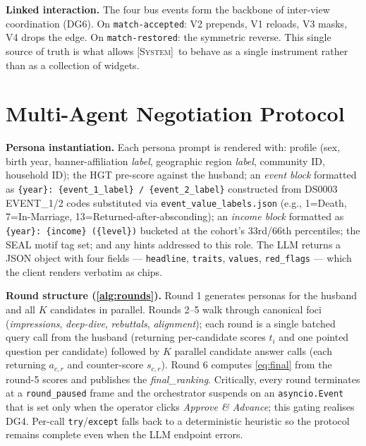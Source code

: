 \documentclass[review]{vgtc}                  %
\newcommand{\system}{\textsc{[System]}\xspace}
\begin{document}
\textbf{Linked interaction.} The four bus events form the backbone of
inter-view coordination (DG6). On \texttt{match-accepted}: V2
prepends, V1 reloads, V3 masks, V4 drops the edge. On
\texttt{match-restored}: the symmetric reverse. This single source of
truth is what allows \system\ to behave as a single instrument
rather than as a collection of widgets.

\section{Multi-Agent Negotiation Protocol}
\label{sec:mas}

\textbf{Persona instantiation.} Each persona prompt is rendered with:
profile (sex, birth year, banner-affiliation \emph{label}, geographic
region \emph{label}, community ID, household ID); the HGT pre-score
against the husband; an \emph{event block} formatted as
\texttt{\{year\}: \{event\_1\_label\} / \{event\_2\_label\}}
constructed from DS0003 EVENT\_1/2 codes substituted via
\texttt{event\_value\_labels.json} (e.g., 1=Death, 7=In-Marriage,
13=Returned-after-absconding); an \emph{income block} formatted as
\texttt{\{year\}: \{income\} (\{level\})} bucketed at the cohort's
33rd/66th percentiles; the SEAL motif tag set; and any hints
addressed to this role. The LLM returns a JSON object with four
fields --- \texttt{headline}, \texttt{traits}, \texttt{values},
\texttt{red\_flags} --- which the client renders verbatim as chips.

\textbf{Round structure (\cref{alg:rounds}).}
Round 1 generates personas for the husband and all $K$ candidates in
parallel. Rounds 2--5 walk through canonical foci
(\emph{impressions}, \emph{deep-dive}, \emph{rebuttals},
\emph{alignment}); each round is a single batched query call from
the husband (returning per-candidate scores $t_i$ and one pointed
question per candidate) followed by $K$ parallel candidate answer
calls (each returning $a_{c,r}$ and counter-score $s_{c,r}$).
Round 6 computes \cref{eq:final} from the round-5 scores and
publishes the \emph{final\_ranking}. Critically, every round
terminates at a \texttt{round\_paused} frame and the orchestrator
suspends on an \texttt{asyncio.Event} that is set only when the
operator clicks \emph{Approve \& Advance}; this gating realises DG4.
Per-call \texttt{try}/\texttt{except} falls back to a deterministic
heuristic so the protocol remains complete even when the LLM
endpoint errors.
\end{document}
